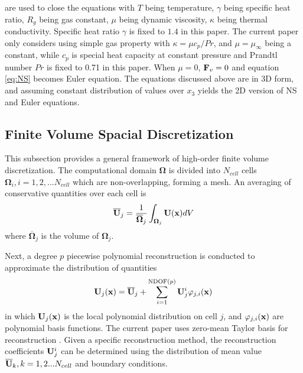 \documentclass[preprint,12pt]{elsarticle}
\begin{document}
are used to close the equations
with $T$ being temperature, $\gamma$ being specific heat ratio,
$R_g$ being  gas constant, $\mu$ being dynamic viscosity,
$\kappa$ being thermal conductivity.
Specific heat ratio $\gamma$ is fixed to $1.4$ in this paper.
The current paper only
considers using simple gas property
with $\kappa = \mu c_p / Pr$,
and $\mu=\mu_{\infty}$ being a constant,
while $c_p$ is special heat capacity
at constant pressure and
Prandtl number $Pr$ is fixed to 0.71 in this paper.
When $\mu=0$,
$\mathbf{F}_v=0$ and
equation \eqref{eq:NS} becomes Euler equation.
The equations discussed above are in 3D form, and
assuming constant distribution of values over $x_3$
yields the 2D version of NS and Euler equations.

\subsection{Finite Volume Spacial Discretization}
\label{ssec:FV}

\newcommand{\OO}{\mathbf{\Omega}}
\newcommand{\UM}{\overline{\U}}
\newcommand{\Fn}{\tilde{\F}}
\newcommand{\n}{\mathbf{n}}
\newcommand{\uu}{\overline{\mathbf{U}}}
\newcommand{\R}{\mathbf{R}}
\newcommand{\inc}{\mathrm\Delta}
\newcommand{\Tau}{\mathrm{T}}

This subsection provides a general framework of
high-order
finite volume discretization.
The computational domain $\OO$ is divided
into $N_{cell}$ cells $\OO_i, i=1,2,...N_{cell}$ which
are non-overlapping, forming a mesh.
An averaging of conservative quantities
over each cell is
\begin{equation}
    \label{eq:FVMean}
    \UM_j = \frac{1}{\overline{\OO}_j}\int_{\OO_j}\U(\x)dV
\end{equation}
where $\overline{\OO}_j$ is the volume of $\OO_j$.

Next, a degree $p$ piecewise polynomial reconstruction is
conducted to approximate the distribution of
quantities
\begin{equation}
    \label{eq:FVRec}
    \U_j(\x) = \UM_j + \sum_{i=1}^{\mathrm{NDOF}(p)}{\U_j^i\varphi_{j,i}(\x) }
\end{equation}
in which $\mathbf{U}_j(\mathbf{x})$ is the local polynomial distribution on cell $j$,
and
$\varphi_{j,i}(\mathbf{x})$ are
polynomial basis functions.
The current paper uses zero-mean Taylor basis
for reconstruction \cite{wang2017compact_VR}.
Given a specific reconstruction method,
the reconstruction coefficients $\mathbf{U}_j^i$ can be determined using
the distribution of mean value $\UM_k, k=1,2...N_{cell}$
and boundary conditions.
\end{document}
